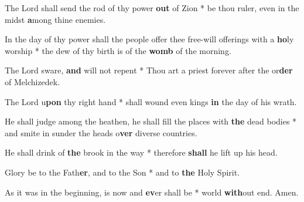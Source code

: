 \begin{multicols}{2}
	The Lord shall send the rod of thy power \textbf{out} of Zion * be thou ruler, even in the midst \textbf{a}mong thine enemies.

	In the day of thy power shall the people offer thee free-will offerings with a \textbf{ho}ly worship * the dew of thy birth is of the \textbf{womb} of the morning.
	
	The Lord sware, \textbf{and} will not repent * Thou art a priest forever after the or\textbf{der} of Melchizedek.
	
	The Lord u\textbf{pon} thy right hand * shall wound even kings \textbf{in} the day of his wrath.
	
	He shall judge among the heathen, he shall fill the places with \textbf{the} dead bodies * and smite in sunder the heads o\textbf{ver} diverse countries.
	
	He shall drink of \textbf{the} brook in the way * therefore \textbf{shall} he lift up his head.
	
	Glory be to the Fath\textbf{er}, and to the Son * and to \textbf{the} Holy Spirit.
	
	As it was in the beginning, is now and \textbf{ev}er shall be * world \textbf{with}out end. Amen.
\end{multicols}